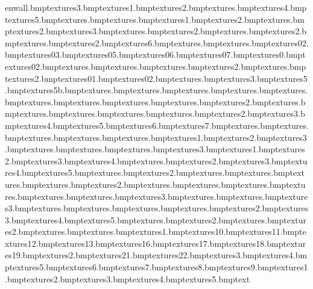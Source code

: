 enwall.bmp textures\greenwall3.bmp textures\grill1.bmp textures\grill2.bmp textures\handdryer.bmp textures\haringfloor4.bmp textures\haringfloor5.bmp textures\horseshoepiccy.bmp textures\hotdog.bmp textures\hotdog1.bmp textures\hotdog2.bmp textures\industcarpet.bmp textures\industcarpet2.bmp textures\industcarpet3.bmp textures\industfloor.bmp textures\industfloor2.bmp textures\industmarb.bmp textures\industmarb2.bmp textures\industwalls.bmp textures\industwalls2.bmp textures\industwalls6.bmp textures\jeans.bmp textures\jel.bmp textures\jel02.bmp textures\jel03.bmp textures\jel05.bmp textures\jel06.bmp textures\jel07.bmp textures\keys0.bmp textures\keys02.bmp textures\lava.bmp textures\leafletcab.bmp textures\leatherseat.bmp textures\leatherseat2.bmp textures\leatherseatgreen.bmp textures\leatherseatgreen2.bmp textures\leaves01.bmp textures\leaves02.bmp textures\libarywall.bmp textures\libarywall3.bmp textures\libarywall5.bmp textures\libarywall5b.bmp textures\liftdoorleft.bmp textures\liftdoorleftred.bmp textures\liftdoorright.bmp textures\liftdoorrightred.bmp textures\liftdoors.bmp textures\liftglass.bmp textures\liftswitch.bmp textures\light.bmp textures\lightbluewall.bmp textures\lightbluewall2.bmp textures\lightstrip.bmp textures\lobbycarpet.bmp textures\lobbycarpetcol.bmp textures\lobbycarpetcorn.bmp textures\lobbydesk.bmp textures\lobbydesk2.bmp textures\lobbydesk3.bmp textures\lobbydesk4.bmp textures\lobbydesk5.bmp textures\lobbydesk6.bmp textures\lobbydesk7.bmp textures\lobbywallpinkbocorn.bmp textures\lobbywallpinkbord.bmp textures\lobbywallpinkbotop.bmp textures\lobbywallpinkstop.bmp textures\lobbywallsbord.bmp textures\locker1.bmp textures\locker2.bmp textures\locker3.bmp textures\lockroomdart.bmp textures\lockroomwall.bmp textures\lorrymixer.bmp textures\lorrymixer3.bmp textures\lp1.bmp textures\lp2.bmp textures\lp3.bmp textures\lp4.bmp textures\marbtiles.bmp textures\marbtiles2.bmp textures\marbtiles3.bmp textures\marbtiles4.bmp textures\marbtiles5.bmp textures\marbwall.bmp textures\marbwall2.bmp textures\marbwallarch.bmp textures\marbwallbord.bmp textures\marbwallpill.bmp textures\marbwalltiles.bmp textures\marbwalltiles2.bmp textures\mat.bmp textures\matclean.bmp textures\matmoney.bmp textures\metaldoor.bmp textures\mixer.bmp textures\mixershine.bmp textures\mixershine3.bmp textures\modcarpet.bmp textures\modfloor.bmp textures\modfloor3.bmp textures\modwall.bmp textures\modwallmarb.bmp textures\museummat.bmp textures\newmoneywall.bmp textures\newmoneywall2.bmp textures\newmoneywall3.bmp textures\newmoneywall4.bmp textures\newmoneywall5.bmp textures\noteboard.bmp textures\noteboard2.bmp textures\nut.bmp textures\nut2.bmp textures\paintdafwarp.bmp textures\paintgoswarp.bmp textures\painting1.bmp textures\painting10.bmp textures\painting11.bmp textures\painting12.bmp textures\painting13.bmp textures\painting16.bmp textures\painting17.bmp textures\painting18.bmp textures\painting19.bmp textures\painting2.bmp textures\painting21.bmp textures\painting22.bmp textures\painting3.bmp textures\painting4.bmp textures\painting5.bmp textures\painting6.bmp textures\painting7.bmp textures\painting8.bmp textures\painting9.bmp textures\paintingclanger1.bmp textures\paintingclanger2.bmp textures\paintingclanger3.bmp textures\paintingclanger4.bmp textures\paintingclanger5.bmp text
